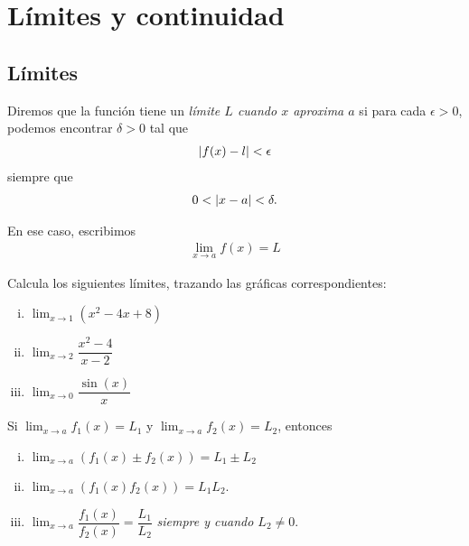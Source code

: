\section{Límites y continuidad}

\subsection{Límites}

 Diremos que la función tiene un \emph{límite $L$ cuando $x$ aproxima $a$} si para cada $\epsilon >0$, podemos encontrar $\delta >0$ tal que
 \begin{align*}
  \left|f(x)-l\right| < \epsilon
  \end{align*}
siempre que
\begin{align*}
 0 < \left|x-a\right| < \delta.
 \end{align*}


  En ese caso, escribimos
  \begin{align*}
   \lim_{x \to a} f(x) = L
   \end{align*}


  \begin{resuelto}
   Calcula los siguientes límites, trazando las gráficas correspondientes:
   \begin{enumerate}[(i)]
     \item $\lim_{x\to 1}\left( x^{2}-4x+8 \right)$
     \item $\lim_{x\to 2}\dfrac{x^{2}-4}{x-2}$
     \item $\lim_{x\to 0}\dfrac{\sin(x)}{x}$
\end{enumerate}
  \end{resuelto}


\begin{proposicion}

	Si $\lim_{x \to a}f_{1}(x)= L_{1}$ y $\lim_{x \to a }f_{2}(x)= L_{2}$, entonces
	\begin{enumerate}[(i)]
		\item $\lim_{x\to a}\left( f_{1}(x)\pm f_{2}(x) \right) = L_{1}\pm L_{2}$
		\item $\lim_{x\to a}\left( f_{1}(x) f_{2}(x)\right)= L_{1}L_{2}$.
		\item
		$\lim_{x \to a}\dfrac{f_{1}(x)}{f_{2}(x)} = \dfrac{L_{1}}{L_{2}}$
		\emph{siempre y cuando $L_{2}\neq 0$}.
	\end{enumerate}
\end{proposicion}

